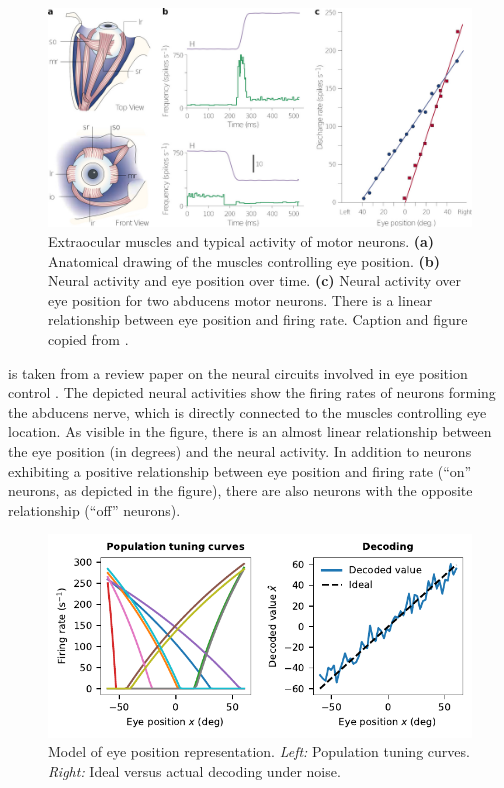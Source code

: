 \documentclass[10pt,letterpaper,oneside]{article}
\begin{document}
\begin{figure}
	\includegraphics{media/sparks_et_al_2002_brainstem_eye.jpg}
	\caption{Extraocular muscles and typical activity of motor neurons. \textbf{(a)} Anatomical drawing of the muscles controlling eye position. \textbf{(b)} Neural activity and eye position over time. \textbf{(c)} Neural activity over eye position for two abducens motor neurons. There is a linear relationship between eye position and firing rate. Caption and figure copied from \cite{sparks2002brainstem}.}
	\label{fig:sparks_et_al_2002_brainstem_eye}
\end{figure}

 is taken from a review paper on the neural circuits involved in eye position control \cite{sparks2002brainstem}. The depicted neural activities show the firing rates of neurons forming the abducens nerve, which is directly connected to the muscles controlling eye location. As visible in the figure, there is an almost linear relationship between the eye position (in degrees) and the neural activity. In addition to neurons exhibiting a positive relationship between eye position and firing rate (\enquote{on} neurons, as depicted in the figure), there are also neurons with the opposite relationship (\enquote{off} neurons).

\begin{figure}
	\centering
	\includegraphics{media/1d_eye_position.pdf}
	\caption{Model of eye position representation. \emph{Left:} Population tuning curves. \emph{Right:} Ideal versus actual decoding under noise. }
	\label{fig:1d_eye_position}
\end{figure}
\end{document}
